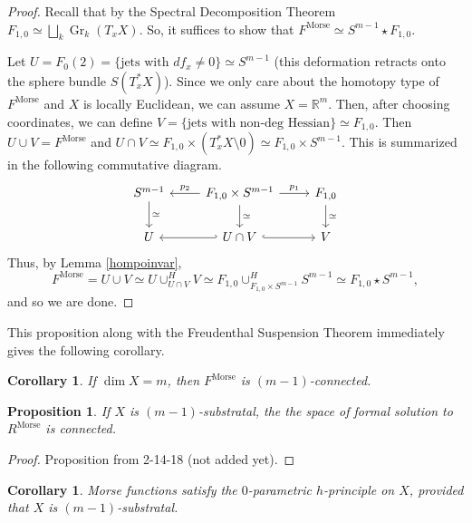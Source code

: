 \documentclass{article}
\newtheorem{proposition}[theorem]{Proposition}
\newtheorem{corollary}[theorem]{Corollary}
\newtheorem{proposed work}[theorem]{Proposed Work}
\theoremstyle{definition}
\DeclareMathOperator{\Morse}{Morse}
\DeclareMathOperator{\Gr}{Gr}
\begin{document}
\begin{proof}
Recall that by the Spectral Decomposition Theorem $F_{1,0} \simeq \bigsqcup_k \Gr_k(T_x X)$. So, it suffices to show that $F^{\Morse} \simeq S^{m-1} \star F_{1,0}$. 

Let $U = F_0{(2)} =  \{ \text{jets with } df_x \neq 0\} \simeq S^{m-1}$ (this deformation retracts onto the sphere bundle $S(T_x^* X)$). Since we only care about the homotopy type of $F^{\Morse}$ and $X$ is locally Euclidean, we can assume $X = \mathbb{R}^m$. Then, after choosing coordinates, we can define $V = \{ \text{jets with non-deg Hessian} \} \simeq F_{1,0}$.  Then $U \cup V = F^{\Morse}$ and $U \cap V \simeq F_{1,0} \times \left( T_x^* X \setminus 0 \right) \simeq F_{1,0} \times S^{m-1}$. This is summarized in the following commutative diagram.
\begin{equation*}
\begin{tikzcd}
S^{m-1} \arrow[d, "\simeq"] & F_{1,0} \times S^{m-1} \arrow[l,swap, "p_2"] \arrow[r, "p_1"] \arrow[d, "\simeq"] & F_{1,0} \arrow[d, "\simeq"] \\
U & U \cap V \arrow[l, hook'] \arrow[r, hook] & V
\end{tikzcd}
\end{equation*}
Thus, by Lemma \ref{hompoinvar}, 
\begin{equation*}
F^{\Morse} = U \cup V \simeq U \cup_{U \cap V}^H V \simeq F_{1,0} \cup_{F_{1,0} \times S^{m-1}}^H S^{m-1} \simeq F_{1,0} \star S^{m-1},
\end{equation*}
and so we are done.
\end{proof}

This proposition along with the Freudenthal Suspension Theorem \cite{may1999concise} immediately gives the following corollary.

\begin{corollary}
If $\dim X = m$, then $F^{\Morse}$ is $(m-1)$-connected.
\end{corollary}

\begin{proposition}
If $X$ is $(m-1)$-substratal, the the space of formal solution to $R^{\Morse}$ is connected.
\end{proposition}

\begin{proof}
Proposition from 2-14-18 (not added yet).
\end{proof}

\begin{corollary}
Morse functions satisfy the $0$-parametric $h$-principle on $X$, provided that $X$ is $(m-1)$-substratal.
\end{corollary}
\end{document}
